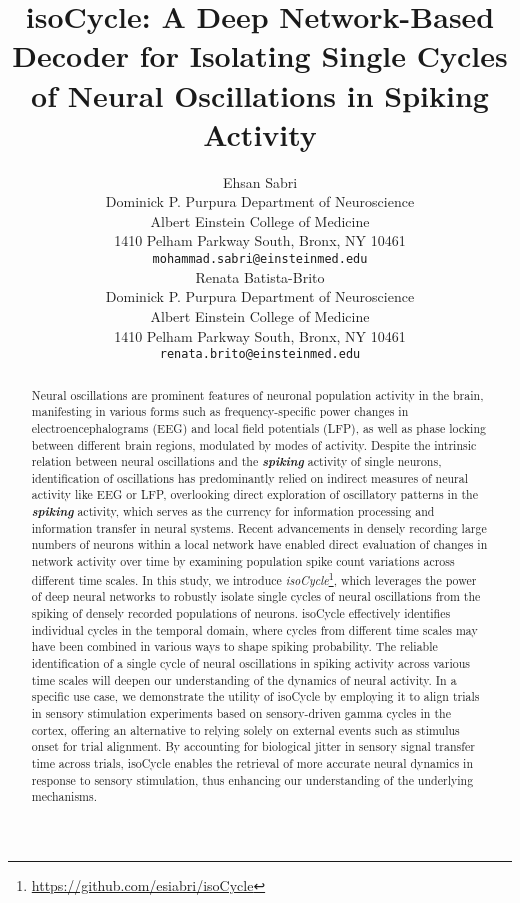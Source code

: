 \documentclass{article}
\title{isoCycle: A Deep Network-Based Decoder for Isolating Single Cycles of Neural Oscillations in Spiking Activity}
\author{%
  Ehsan Sabri\\%
  Dominick P. Purpura Department of Neuroscience\\
  Albert Einstein College of Medicine\\
  1410 Pelham Parkway South, Bronx, NY 10461\\
  \texttt{mohammad.sabri@einsteinmed.edu} \\
  \And
  Renata Batista-Brito\\%
  Dominick P. Purpura Department of Neuroscience\\
  Albert Einstein College of Medicine\\
  1410 Pelham Parkway South, Bronx, NY 10461\\
  \texttt{renata.brito@einsteinmed.edu} \\
}
\begin{document}
\maketitle

\setcounter{footnote}{0}

\begin{abstract}
  Neural oscillations are prominent features of neuronal population activity in the brain, manifesting in various forms such as frequency-specific power changes in electroencephalograms (EEG) and local field potentials (LFP), as well as phase locking between different brain regions, modulated by modes of activity. Despite the intrinsic relation between neural oscillations and the \textbf{\emph{spiking}} activity of single neurons, identification of oscillations has predominantly relied on indirect measures of neural activity like EEG or LFP, overlooking direct exploration of oscillatory patterns in the \textbf{\emph{spiking}} activity, which serves as the currency for information processing and information transfer in neural systems. Recent advancements in densely recording large numbers of neurons within a local network have enabled direct evaluation of changes in network activity over time by examining population spike count variations across different time scales. In this study, we introduce \emph{isoCycle}\footnote{\url{https://github.com/esiabri/isoCycle}}, which leverages the power of deep neural networks to robustly isolate single cycles of neural oscillations from the spiking of densely recorded populations of neurons. isoCycle effectively identifies individual cycles in the temporal domain, where cycles from different time scales may have been combined in various ways to shape spiking probability. The reliable identification of a single cycle of neural oscillations in spiking activity across various time scales will deepen our understanding of the dynamics of neural activity. In a specific use case, we demonstrate the utility of isoCycle by employing it to align trials in sensory stimulation experiments based on sensory-driven gamma cycles in the cortex, offering an alternative to relying solely on external events such as stimulus onset for trial alignment. By accounting for biological jitter in sensory signal transfer time across trials, isoCycle enables the retrieval of more accurate neural dynamics in response to sensory stimulation, thus enhancing our understanding of the underlying mechanisms.
\end{abstract}

\newpage
\end{document}
